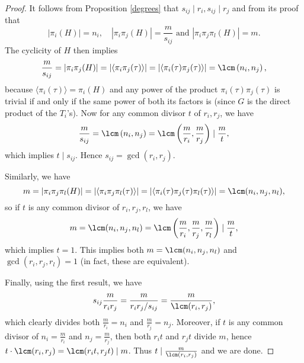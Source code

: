 \begin{proof}
It follows from Proposition \ref{degrees} that $s_{ij}\mid r_i, s_{ij}\mid r_j$ and from its proof that $$|\pi_i(H)|=n_i, \quad |\pi_i\pi_j(H)|=\frac{m}{s_{ij}} \text{ and } |\pi_i\pi_j\pi_l(H)|=m.$$ The cyclicity of $H$ then implies
$$\frac{m}{s_{ij}}=|\pi_i\pi_j(H)|=|\langle\pi_i\pi_j(\tau)\rangle|=|\langle\pi_i(\tau)\pi_j(\tau)\rangle|=\lcm\left(n_i,n_j\right),$$
because $\langle\pi_i(\tau)\rangle=\pi_i(H)$ and any power of the product $\pi_i(\tau)\pi_j(\tau)$ is trivial if and only if the same power of both its factors is (since $G$ is the direct product of the $T_i$'s). 
Now for any common divisor $t$ of $r_i,r_j$, we have $$\frac{m}{s_{ij}}= \lcm\left(n_i,n_j\right)=\lcm\left(\frac{m}{r_i},\frac{m}{r_j}\right) \mid \frac{m}{t},$$ which implies $t\mid s_{ij}$. Hence $s_{ij}=\gcd(r_i,r_j)$.

Similarly, we have
$$m=|\pi_i\pi_j\pi_l(H)|=|\langle\pi_i\pi_j\pi_l(\tau)\rangle|=|\langle\pi_i(\tau)\pi_j(\tau)\pi_l(\tau)\rangle|=\lcm(n_i,n_j,n_l),$$
so if $t$ is any common divisor of $r_i,r_j,r_l$, we have $$m=\lcm(n_i,n_j,n_l)=\lcm\left(\frac{m}{r_i},\frac{m}{r_j},\frac{m}{r_l}\right) \mid \frac{m}{t},$$ which implies $t=1$. This implies both $m=\lcm(n_i,n_j,n_l)$ and $\gcd(r_i,r_j,r_l)=1$ (in fact, these are equivalent).

Finally, using the first result, we have $$s_{ij}\frac{m}{r_ir_j}=\frac{m}{r_ir_j/s_{ij}}=\frac{m}{\lcm(r_i,r_j)},$$ which clearly divides both $\frac{m}{r_i}=n_i$ and $\frac{m}{r_j}=n_j$. Moreover, if $t$ is any common divisor of $n_i=\frac{m}{r_i}$ and $n_j=\frac{m}{r_j}$, then both $r_it$ and $r_jt$ divide $m$, hence $t\cdot\lcm(r_i,r_j)=\lcm(r_it,r_jt)\mid m$. Thus $t\mid \frac{m}{\lcm(r_i,r_j)}$ and we are done.
\end{proof}

